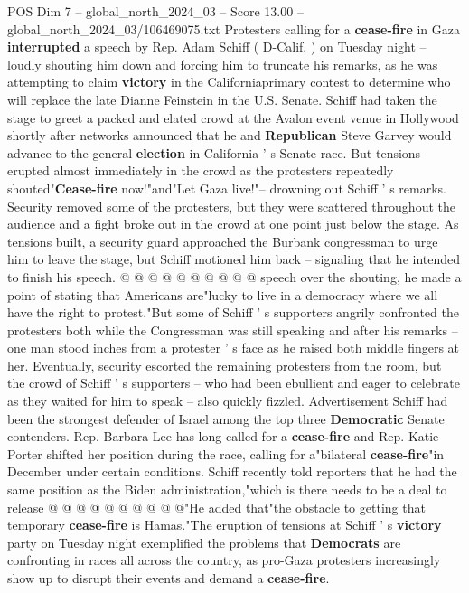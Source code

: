 \begin{textsample}{POS Dim 7 – global\_north\_2024\_03 – Score 13.00 – global\_north\_2024\_03/106469075.txt}  \label{ex:f7_pos_036}
Protesters calling for a \textbf{cease-fire} in Gaza \textbf{interrupted} a speech by Rep.
Adam Schiff ( D-Calif. ) on Tuesday night -- loudly shouting him down and forcing him to truncate his remarks, as he was attempting to claim \textbf{victory} in the Californiaprimary contest to determine who will replace the late Dianne Feinstein in the U.S.
Senate.
Schiff had taken the stage to greet a packed and elated crowd at the Avalon event venue in Hollywood shortly after networks announced that he and \textbf{Republican} Steve Garvey would advance to the general \textbf{election} in California ' s Senate race.
But tensions erupted almost immediately in the crowd as the protesters repeatedly shouted"\textbf{Cease-fire} now!"and"Let Gaza live!"-- drowning out Schiff ' s remarks.
Security removed some of the protesters, but they were scattered throughout the audience and a fight broke out in the crowd at one point just below the stage.
As tensions built, a security guard approached the Burbank congressman to urge him to leave the stage, but Schiff motioned him back -- signaling that he intended to finish his speech. @ @ @ @ @ @ @ @ @ @ speech over the shouting, he made a point of stating that Americans are"lucky to live in a democracy where we all have the right to protest."But some of Schiff ' s supporters angrily confronted the protesters both while the Congressman was still speaking and after his remarks -- one man stood inches from a protester ' s face as he raised both middle fingers at her.
Eventually, security escorted the remaining protesters from the room, but the crowd of Schiff ' s supporters -- who had been ebullient and eager to celebrate as they waited for him to speak -- also quickly fizzled.
Advertisement Schiff had been the strongest defender of Israel among the top three \textbf{Democratic} Senate contenders.
Rep.
Barbara Lee has long called for a \textbf{cease-fire} and Rep.
Katie Porter shifted her position during the race, calling for a"bilateral \textbf{cease-fire}"in December under certain conditions.
Schiff recently told reporters that he had the same position as the Biden administration,"which is there needs to be a deal to release @ @ @ @ @ @ @ @ @ @"He added that"the obstacle to getting that temporary \textbf{cease-fire} is Hamas."The eruption of tensions at Schiff ' s \textbf{victory} party on Tuesday night exemplified the problems that \textbf{Democrats} are confronting in races all across the country, as pro-Gaza protesters increasingly show up to disrupt their events and demand a \textbf{cease-fire}.

\end{textsample}
